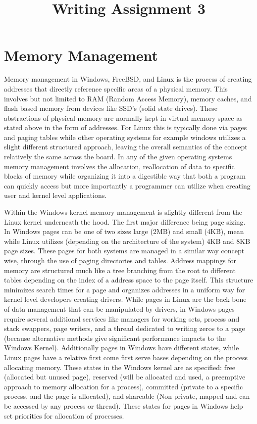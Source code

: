 \documentclass[letterpaper,10pt,titlepage]{IEEEtran}
\author{\name}
\title{Writing Assignment 3}
\begin{document}
\maketitle
\hrulefill

\section{Memory Management}
Memory management in Windows, FreeBSD, and Linux is the process of creating addresses that directly reference specific areas of a physical memory. This involves but not limited to RAM (Random Access Memory), memory caches, and flash based memory from devices like SSD's (solid state drives)\cite{Whatisme93:online}. These abstractions of physical memory are normally kept in virtual memory space as stated above in the form of addresses. For Linux this is typically done via pages and paging tables while other operating systems for example windows utilizes a slight different structured approach, leaving the overall semantics of the concept relatively the same across the board. In any of the given operating systems memory management involves the allocation, reallocation of data to specific blocks of memory while organizing it into a digestible way that both a program can quickly access but more importantly a programmer can utilize when creating user and kernel level applications. 

Within the Windows kernel memory management is slightly different from the Linux kernel underneath the hood. The first major difference being page sizing. In Windows pages can be one of two sizes large (2MB) and small (4KB)\cite{windowsbookpt1}, mean while Linux utilizes (depending on the architecture of the system) 4KB and 8KB page sizes\cite{Linux_book}. These pages for both systems are managed in a similar way concept wise, through the use of paging directories and tables. Address mappings for memory are structured much like a tree branching from the root to different tables depending on the index of a address space to the page itself. This structure minimizes search times for a page and organizes addresses in a uniform way for kernel level developers creating drivers. While pages in Linux are the back bone of data management that can be manipulated by drivers, in Windows pages require several additional services like managers for working sets, process and stack swappers, page writers, and a thread dedicated to writing zeros to a page (because alternative methods give significant performance impacts to the Windows Kernel). Additionally pages in Windows have different states, while Linux pages have a relative first come first serve bases depending on the process allocating memory. These states in the Windows kernel are as specified: free (allocated but unused page), reserved (will be allocated and used, a preemptive approach to memory allocation for a process), committed (private to a specific process, and the page is allocated), and shareable (Non private, mapped and can be accessed by any process or thread). These states for pages in Windows help set priorities for allocation of processes.
\end{document}
